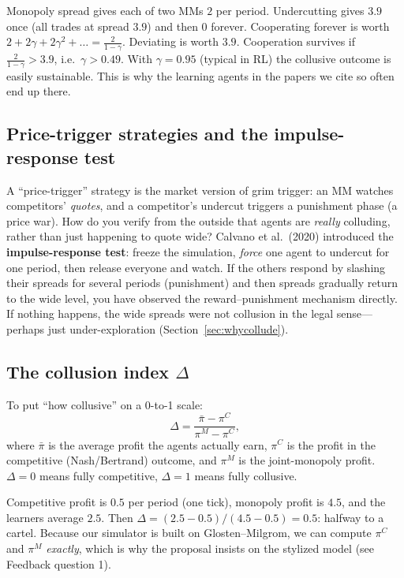 \documentclass[11pt]{article}
\begin{document}
\begin{example}
Monopoly spread gives each of two MMs $2$ per period. Undercutting gives $3.9$ once (all trades at spread $3.9$) and then $0$ forever. Cooperating forever is worth $2+2\gamma+2\gamma^2+\dots=\frac{2}{1-\gamma}$. Deviating is worth $3.9$. Cooperation survives if $\frac{2}{1-\gamma}>3.9$, i.e.\ $\gamma>0.49$. With $\gamma=0.95$ (typical in RL) the collusive outcome is easily sustainable. This is why the learning agents in the papers we cite so often end up there.
\end{example}

\subsection{Price-trigger strategies and the impulse-response test}\label{sec:impulse}
A ``price-trigger'' strategy is the market version of grim trigger: an MM watches competitors' \emph{quotes}, and a competitor's undercut triggers a punishment phase (a price war). How do you verify from the outside that agents are \emph{really} colluding, rather than just happening to quote wide? Calvano et al.\ (2020) introduced the \textbf{impulse-response test}: freeze the simulation, \emph{force} one agent to undercut for one period, then release everyone and watch. If the others respond by slashing their spreads for several periods (punishment) and then spreads gradually return to the wide level, you have observed the reward--punishment mechanism directly. If nothing happens, the wide spreads were not collusion in the legal sense---perhaps just under-exploration (Section~\ref{sec:whycollude}).

\subsection{The collusion index $\Delta$}
To put ``how collusive'' on a 0-to-1 scale:
\[
\Delta=\frac{\bar\pi-\pi^{C}}{\pi^{M}-\pi^{C}},
\]
where $\bar\pi$ is the average profit the agents actually earn, $\pi^C$ is the profit in the competitive (Nash/Bertrand) outcome, and $\pi^M$ is the joint-monopoly profit. $\Delta=0$ means fully competitive, $\Delta=1$ means fully collusive.

\begin{example}
Competitive profit is $0.5$ per period (one tick), monopoly profit is $4.5$, and the learners average $2.5$. Then $\Delta=(2.5-0.5)/(4.5-0.5)=0.5$: halfway to a cartel. Because our simulator is built on Glosten--Milgrom, we can compute $\pi^C$ and $\pi^M$ \emph{exactly}, which is why the proposal insists on the stylized model (see Feedback question 1).
\end{example}
\end{document}

